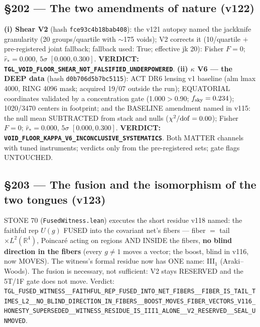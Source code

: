 \documentclass[11pt]{article}
\theoremstyle{definition}\newtheorem{deriv}{Derivation}
\begin{document}
\subsection*{\S202 --- The two amendments of nature (v122)}\textbf{(i) Shear V2} (hash \texttt{fce93c4b18bab408}): the v121 autopsy named the jackknife granularity (20 groups/quartile with $\sim$175 voids); V2 corrects it (10/quartile $+$ pre-registered joint fallback; fallback used: True; effective jk 20): Fisher $F=0$; $\hat r_*=0.000$, $5\sigma$ $[0.000,0.300]$. \textbf{VERDICT: \texttt{TGL\_VOID\_FLOOR\_SHEAR\_NOT\_FALSIFIED\_UNDERPOWERED}}. \textbf{(ii) $\kappa$ V6 --- the DEEP data} (hash \texttt{d0b706d5b7bc5115}): ACT DR6 lensing v1 baseline (alm lmax 4000, RING 4096 mask; acquired 19/07 outside the run); EQUATORIAL coordinates validated by a concentration gate (1.000$>$0.90; $f_{\rm sky}=0.234$); 1020/3470 centers in footprint; and the BASELINE amendment named in v115: the null mean SUBTRACTED from stack and nulls ($\chi^2/{\rm dof}=0.00$); Fisher $F=0$; $\hat r_*=0.000$, $5\sigma$ $[0.000,0.300]$. \textbf{VERDICT: \texttt{VOID\_FLOOR\_KAPPA\_V6\_INCONCLUSIVE\_SYSTEMATICS}}. Both MATTER channels with tuned instruments; verdicts only from the pre-registered sets; gate flags UNTOUCHED.

\subsection*{\S203 --- The fusion and the isomorphism of the two tongues (v123)}STONE 70 (\texttt{FusedWitness.lean}) executes the short residue v118 named: the faithful rep $U(g)$ FUSED into the covariant net's fibers --- fiber $=$ tail $\times L^2(\mathbb{R}^4)$, Poincaré acting on regions AND INSIDE the fibers, \textbf{no blind direction in the fibers} (every $g\neq1$ moves a vector; the boost, blind in v116, now MOVES). The witness's formal residue now has ONE name: III$_1$ (Araki--Woods). The fusion is necessary, not sufficient: V2 stays RESERVED and the 5T/1F gate does not move. Verdict: \texttt{TGL\_FUSED\_WITNESS\_\_FAITHFUL\_REP\_FUSED\_INTO\_NET\_FIBERS\_\_FIBER\_IS\_TAIL\_TIMES\_L2\_\_NO\_BLIND\_DIRECTION\_IN\_FIBERS\_\_BOOST\_MOVES\_FIBER\_VECTORS\_V116\_HONESTY\_SUPERSEDED\_\_WITNESS\_RESIDUE\_IS\_III1\_ALONE\_\_V2\_RESERVED\_\_SEAL\_UNMOVED}.
\end{document}
